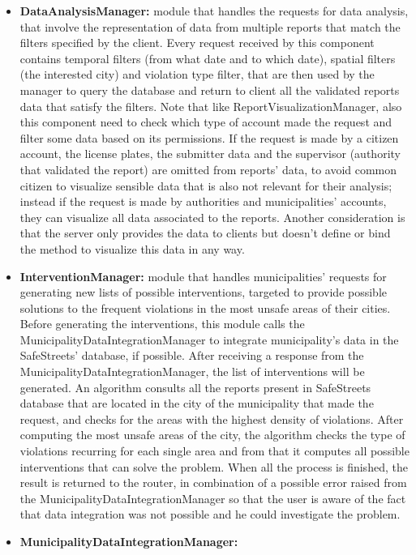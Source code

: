 \begin{itemize}
	\item \textbf{DataAnalysisManager:}
	module that handles the requests for data analysis, that involve the representation of data from multiple reports that match the filters specified by the client. Every request received by this component contains temporal filters (from what date and to which date), spatial filters (the interested city) and violation type filter, that are then used by the manager to query the database and return to client all the validated reports data that satisfy the filters. Note that like ReportVisualizationManager, also this component need to check which type of account made the request and filter some data based on its permissions. If the request is made by a citizen account, the license plates, the submitter data and the supervisor (authority that validated the report) are omitted from reports' data, to avoid common citizen to visualize sensible data that is also not relevant for their analysis; instead if the request is made by authorities and municipalities' accounts, they can visualize all data associated to the reports. Another consideration is that the server only provides the data to clients but doesn't define or bind the method to visualize this data in any way.   
	\item \textbf{InterventionManager:}
	module that handles municipalities' requests for generating new lists of possible interventions, targeted to provide possible solutions to the frequent violations in the most unsafe areas of their cities. Before generating the interventions, this module calls the MunicipalityDataIntegrationManager to integrate municipality's data in the SafeStreets' database, if possible. After receiving a response from the MunicipalityDataIntegrationManager, the list of interventions will be generated. An algorithm consults all the reports present in SafeStreets database that are located in the city of the municipality that made the request, and checks for the areas with the highest density of violations. After computing the most unsafe areas of the city, the algorithm checks the type of violations recurring for each single area and from that it computes all possible interventions that can solve the problem. When all the process is finished, the result is returned to the router, in combination of a possible error raised from the MunicipalityDataIntegrationManager so that the user is aware of the fact that data integration was not possible and he could investigate the problem.
	\item \textbf{MunicipalityDataIntegrationManager:}

\end{itemize}
